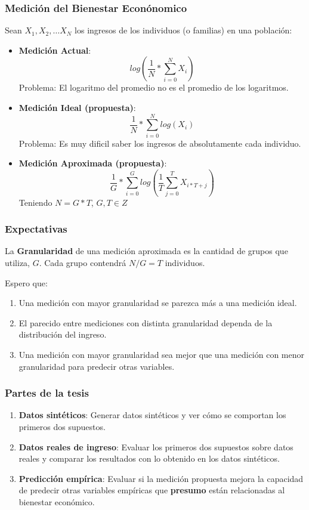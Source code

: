 \documentclass[10pt,mathserif]{beamer}%
\begin{document}
\begin{frame}
\frametitle{Medición del Bienestar Econónomico}
    Sean $X_1, X_2, \dots X_N$ los ingresos de los individuos (o familias) en una población:
    \begin{itemize}
        \item \textbf{Medición Actual}: 
        $$ 
        log(\frac{1}{N} * \sum_{i=0}^N X_i)
        $$
        Problema: El logaritmo del promedio no es el promedio de los logaritmos.
        \pause
        \item \textbf{Medición Ideal (propuesta)}:
        $$
        \frac{1}{N} * \sum_{i=0}^N log(X_i)
        $$
        Problema: Es muy dificil saber los ingresos de absolutamente cada individuo.
        \pause
        \item \textbf{Medición Aproximada (propuesta)}:
        $$
        \frac{1}{G} * \sum_{i=0}^G log(\frac{1}{T} \sum_{j = 0}^{T} X_{i*T+j})
        $$
        Teniendo $N = G * T$, $G, T \in Z$
    \end{itemize}
\end{frame}

\begin{frame}
    \frametitle{Expectativas}
    \begin{definition}[Granularidad]
        La \textbf{Granularidad} de una medición aproximada es la cantidad de grupos que utiliza, $G$.
        Cada grupo contendrá $N/G = T$ individuos.
    \end{definition}

    Espero que:
    \pause
    \begin{enumerate}
        \item Una medición con mayor granularidad se parezca más a una medición ideal. 
        \pause
        \item El parecido entre mediciones con distinta granularidad dependa de la distribución del ingreso.
        \pause 
        \item Una medición con mayor granularidad sea mejor que una medición con menor granularidad para predecir otras variables.
    \end{enumerate}

\end{frame}

\begin{frame}
    \frametitle{Partes de la tesis}
    \begin{enumerate}
        \item \textbf{Datos sintéticos}: Generar datos sintéticos y ver cómo se comportan los primeros dos supuestos.
        \item \textbf{Datos reales de ingreso}: Evaluar los primeros dos supuestos sobre datos reales y comparar los resultados con lo obtenido en los datos sintéticos.
        \item \textbf{Predicción empírica}: Evaluar si la medición propuesta mejora la capacidad de predecir otras variables empíricas que \textbf{presumo} están relacionadas al bienestar económico.
    \end{enumerate}
\end{frame}
\end{document}
